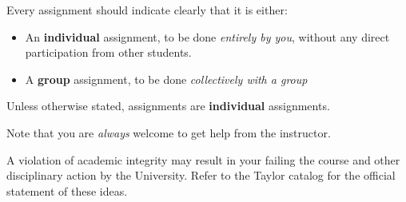 Every assignment should indicate clearly
that it is either:
\begin{itemize}
\item An \textbf{individual} assignment,
  to be done \emph{entirely by you},
  without any direct participation from other students.
\item A \textbf{group} assignment, to be done \emph{collectively with a group}
\end{itemize}
Unless otherwise stated,
assignments are \textbf{individual} assignments.

\begin{framed}
Note that you are \emph{always} welcome
to get help from the instructor.
\end{framed}

A violation of academic integrity may result in your failing the course
and other disciplinary action by the University.
Refer to the Taylor catalog for the official statement of these ideas.


